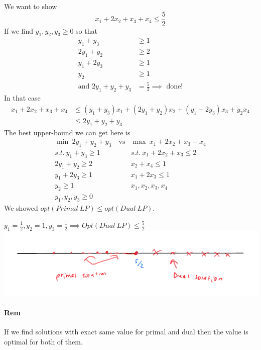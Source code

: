 \documentclass[12 pt]{article}
\begin{document}
          We want to show $$x_1 + 2x_2 + x_3 + x_4 \leq \frac{5}{2}$$
          If we find $y_1, y_2, y_3 \geq 0$ so that
          \begin{align*}
            y_1 + y_3 & \geq 1
            \\ 2y_1 + y_2 & \geq 2
            \\ y_1 + 2y_3 & \geq 1
            \\ y_2 & \geq 1
            \\\text{and }2y_1+y_2+y_3 & = \frac{5}{2} \implies \text{ done!}
          \end{align*}
          In that case
          \begin{align*}
            x_1 + 2x_2 + x_3 + x_4 & \leq (y_1 + y_3)x_1 + (2y_1 + y_2)x_2 + (y_1 + 2y_3)x_3 + y_2x_4
            \\ & \leq 2y_1 + y_2 + y_3
          \end{align*}
          The best upper-bound we can get here is
          \begin{align*}
            \min \ 2y_1 + y_2 + y_3 \ & \text{vs} & \max \ x_1 + 2x_2 + x_3 + x_4
            \\ s.t. \ y_1 + y_3 \geq 1 & & s.t. \ x_1 + 2x_2 + x_3 \leq 2
            \\ 2y_1 + y_2 \geq 2 & & x_2 + x_4 \leq 1
            \\ y_1+2y_3 \geq 1 & & x_1 +2x_3 \leq 1
            \\ y_2 \geq 1 & & x_1, x_2, x_3, x_4
            \\ y_1,y_2,y_3 \geq 0
          \end{align*}
          We showed $opt(Primal \ LP) \leq opt(Dual\ LP)$.

          $y_1= \frac{1}{2}, y_2 = 1, y_3 = \frac{1}{2} \implies
          Opt(Dual \ LP) \leq \frac{5}{2}$
          \\ \includegraphics[width=.9\textwidth]{i109.pdf}
          \paragraph{Rem} If we find solutions with exact same value
          for primal and dual then the value is optimal for both of
          them.
\end{document}
